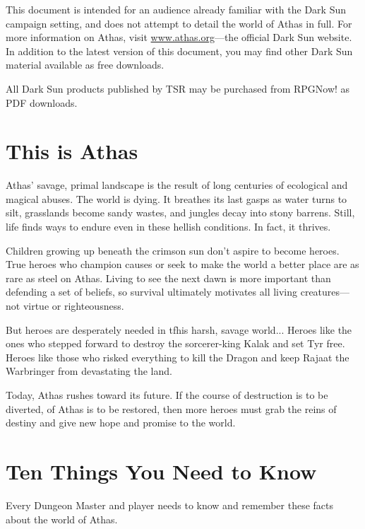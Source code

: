 This document is intended for an audience already familiar with the {\tableheader Dark Sun} campaign setting, and does not attempt to detail the world of Athas in full. For more information on Athas, visit \url{www.athas.org}---the official {\tableheader Dark Sun} website. In addition to the latest version of this document, you may find other {\tableheader Dark Sun} material available as free downloads.

All {\tableheader Dark Sun} products published by TSR may be purchased from RPGNow! as PDF downloads.

\section{This is Athas}
Athas' savage, primal landscape is the result of long centuries of ecological and magical abuses. The world is dying. It breathes its last gasps as water turns to silt, grasslands become sandy wastes, and jungles decay into stony barrens. Still, life finds ways to endure even in these hellish conditions. In fact, it thrives.

Children growing up beneath the crimson sun don't aspire to become heroes. True heroes who champion causes or seek to make the world a better place are as rare as steel on Athas. Living to see the next dawn is more important than defending a set of beliefs, so survival ultimately motivates all living creatures---not virtue or righteousness.

But heroes are desperately needed in tfhis harsh, savage world... Heroes like the ones who stepped forward to destroy the sorcerer-king Kalak and set Tyr free. Heroes like those who risked everything to kill the Dragon and keep Rajaat the Warbringer from devastating the land.

Today, Athas rushes toward its future. If the course of destruction is to be diverted, of Athas is to be restored, then more heroes must grab the reins of destiny and give new hope and promise to the world.

\section{Ten Things You Need to Know}
Every Dungeon Master and player needs to know and remember these facts about the world of Athas.

